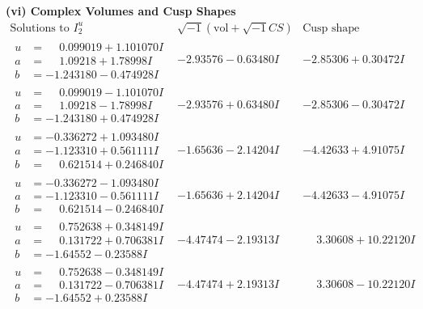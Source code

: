 \documentclass[1p]{elsarticle_modified}
\theoremstyle{definition}
\newcommand{\I}{\sqrt{-1}}
\begin{document}
\newpage\flushleft \textbf{(vi) Complex Volumes and Cusp Shapes}
$$\begin{array}{c|c|c}  
\text{Solutions to }I^u_{2}& \I (\text{vol} + \sqrt{-1}CS) & \text{Cusp shape}\\
 \hline 
\begin{aligned}
u &= \phantom{-}0.099019 + 1.101070 I \\
a &= \phantom{-}1.09218 + 1.78998 I \\
b &= -1.243180 - 0.474928 I\end{aligned}
 & -2.93576 - 0.63480 I & -2.85306 + 0.30472 I \\ \hline\begin{aligned}
u &= \phantom{-}0.099019 - 1.101070 I \\
a &= \phantom{-}1.09218 - 1.78998 I \\
b &= -1.243180 + 0.474928 I\end{aligned}
 & -2.93576 + 0.63480 I & -2.85306 - 0.30472 I \\ \hline\begin{aligned}
u &= -0.336272 + 1.093480 I \\
a &= -1.123310 + 0.561111 I \\
b &= \phantom{-}0.621514 + 0.246840 I\end{aligned}
 & -1.65636 - 2.14204 I & -4.42633 + 4.91075 I \\ \hline\begin{aligned}
u &= -0.336272 - 1.093480 I \\
a &= -1.123310 - 0.561111 I \\
b &= \phantom{-}0.621514 - 0.246840 I\end{aligned}
 & -1.65636 + 2.14204 I & -4.42633 - 4.91075 I \\ \hline\begin{aligned}
u &= \phantom{-}0.752638 + 0.348149 I \\
a &= \phantom{-}0.131722 + 0.706381 I \\
b &= -1.64552 - 0.23588 I\end{aligned}
 & -4.47474 - 2.19313 I & \phantom{-}3.30608 + 10.22120 I \\ \hline\begin{aligned}
u &= \phantom{-}0.752638 - 0.348149 I \\
a &= \phantom{-}0.131722 - 0.706381 I \\
b &= -1.64552 + 0.23588 I\end{aligned}
 & -4.47474 + 2.19313 I & \phantom{-}3.30608 - 10.22120 I \\ \hline\begin{aligned}

\end{aligned}
\end{array}$$
\end{document}

